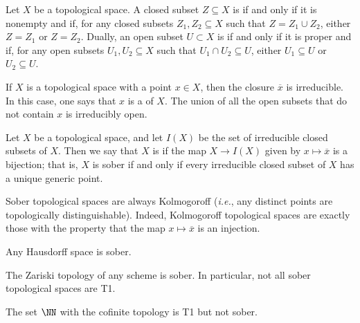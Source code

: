 \begin{dfn}
	Let $ X $ be a topological space.
	A closed subset $ Z \subseteq X $ is  if and only if it is nonempty and if, for any closed subsets $ Z_1, Z_2 \subseteq X $ such that $ Z = Z_1 \cup Z_2 $, either $ Z = Z_1 $ or $ Z = Z_2 $.
	Dually, an open subset $ U \subset X $ is  if and only if it is proper and if, for any open subsets $ U_1, U_2 \subseteq X $ such that $ U_1 \cap U_2 \subseteq U $, either $ U_1 \subseteq U $ or $ U_2 \subseteq U $.
\end{dfn}

\begin{exm}
	If $ X $ is a topological space with a point $ x \in X $, then the closure $ \overline{x} $ is irreducible.
	In this case, one says that $ x $ is a  of $ X $.
	The union of all the open subsets that do not contain $ x $ is irreducibly open.
\end{exm}

\begin{dfn}
	Let $ X $ be a topological space, and let $ I(X) $ be the set of irreducible closed subsets of $ X $.
	Then we say that $ X $ is  if the map $ X \to I(X) $ given by $ x \mapsto \overline{x} $ is a bijection;
	that is, $ X $ is sober if and only if every irreducible closed subset of $ X $ has a unique generic point.
\end{dfn}

\begin{nul}
	Sober topological spaces are always Kolmogoroff
	(\textit{i.e.}, any distinct points are topologically distinguishable).
	Indeed, Kolmogoroff topological spaces are exactly those with the property that the map $ x \mapsto \overline{x} $ is an injection.
\end{nul}

\begin{exm}
	Any Hausdorff space is sober.
\end{exm}

\begin{exm}
	The Zariski topology of any scheme is sober.
	In particular, not all sober topological spaces are T1.
\end{exm}

\begin{exm}
	The set $ \NN $ with the cofinite topology is T1 but not sober.
\end{exm}

